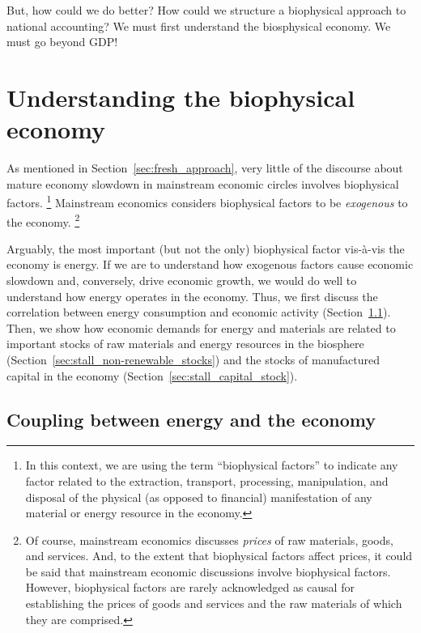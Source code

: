 But, how could we do better? 
How could we structure a biophysical approach to national accounting?
We must first understand the biosphysical economy.
We must go beyond GDP!


\section{Understanding the biophysical economy}
\label{sec:exogenous_factors}

As mentioned in Section~\ref{sec:fresh_approach}, 
very little of the discourse 
about mature economy slowdown 
in mainstream economic circles
involves biophysical factors.%
	\footnote{
	In this context, we are using the term ``biophysical factors''
	to indicate any factor related to 
	the extraction, transport, processing, manipulation, and disposal 
	of the physical (as opposed to financial) manifestation 
	of any material or energy resource in the economy.
	}
Mainstream economics considers biophysical factors
to be \emph{exogenous} to the economy.%
	\footnote{
	Of course, mainstream economics discusses \emph{prices}
	of raw materials, goods, and services. 
	And, to the extent that biophysical factors affect prices,
	it could be said that mainstream economic discussions involve
	biophysical factors.
	However, biophysical factors are rarely acknowledged as causal 
	for establishing the prices of goods and services and the raw materials 
	of which they are comprised.
	}

Arguably, the most important (but not the only) biophysical factor 
vis-\`{a}-vis the economy is energy.
If we are to understand how exogenous factors cause economic slowdown
and, conversely, drive economic growth,
we would do well to understand how energy operates in the economy.
Thus, we first discuss the correlation 
between energy consumption and economic activity 
(Section~\ref{sec:energy-economy_coupling}).
Then, we show how economic demands for energy and materials
are related to important stocks 
of raw materials and energy resources in the biosphere 
(Section~\ref{sec:stall_non-renewable_stocks})
and the stocks of manufactured capital in the economy
(Section~\ref{sec:stall_capital_stock}).


\subsection{Coupling between energy and the economy}
\label{sec:energy-economy_coupling}

